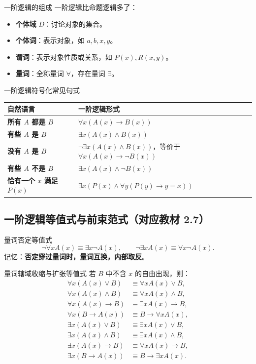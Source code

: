 \documentclass[UTF8,zihao=-4]{ctexart}
\newcommand{\kw}[1]{\textbf{\color{main}#1}}
\begin{document}
\begin{corebox}{一阶逻辑的组成}
一阶逻辑比命题逻辑多了：
\begin{itemize}
  \item \kw{个体域} $D$：讨论对象的集合。
  \item \kw{个体词}：表示对象，如 $a,b,x,y$。
  \item \kw{谓词}：表示对象性质或关系，如 $P(x),R(x,y)$。
  \item \kw{量词}：全称量词 $\forall$，存在量词 $\exists$。
\end{itemize}
\end{corebox}

\begin{methodbox}{一阶逻辑符号化常见句式}
\begin{center}
\begin{tabularx}{\textwidth}{>{\bfseries}p{4.2cm}X}
\toprule
自然语言 & 一阶逻辑形式 \\
\midrule
所有 $A$ 都是 $B$ & $\forall x(A(x)\to B(x))$ \\
有些 $A$ 是 $B$ & $\exists x(A(x)\land B(x))$ \\
没有 $A$ 是 $B$ & $\neg\exists x(A(x)\land B(x))$，等价于 $\forall x(A(x)\to\neg B(x))$ \\
有些 $A$ 不是 $B$ & $\exists x(A(x)\land\neg B(x))$ \\
恰有一个 $x$ 满足 $P(x)$ & $\exists x(P(x)\land\forall y(P(y)\to y=x))$ \\
\bottomrule
\end{tabularx}
\end{center}
\end{methodbox}

\subsection{一阶逻辑等值式与前束范式（对应教材 2.7）}

\begin{corebox}{量词否定等值式}
\[
\neg\forall x A(x)\equiv \exists x\neg A(x),\qquad
\neg\exists x A(x)\equiv \forall x\neg A(x).
\]
记忆：\kw{否定穿过量词时，量词互换，内部取反}。
\end{corebox}

\begin{corebox}{量词辖域收缩与扩张等值式}
若 $B$ 中不含 $x$ 的自由出现，则：
\begin{align*}
\forall x(A(x)\lor B)&\equiv \forall xA(x)\lor B,\\
\forall x(A(x)\land B)&\equiv \forall xA(x)\land B,\\
\forall x(A(x)\to B)&\equiv \exists xA(x)\to B,\\
\forall x(B\to A(x))&\equiv B\to\forall xA(x),\\[0.4em]
\exists x(A(x)\lor B)&\equiv \exists xA(x)\lor B,\\
\exists x(A(x)\land B)&\equiv \exists xA(x)\land B,\\
\exists x(A(x)\to B)&\equiv \forall xA(x)\to B,\\
\exists x(B\to A(x))&\equiv B\to\exists xA(x).
\end{align*}
\end{corebox}
\end{document}
